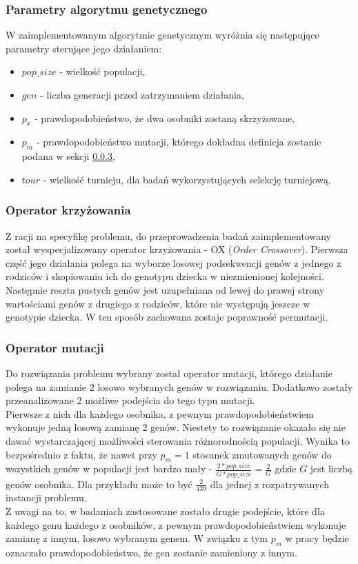 \documentclass{article}
\begin{document}
	\subsubsection{Parametry algorytmu genetycznego}
	W zaimplementowanym algorytmie genetycznym wyróżnia się następujące parametry sterujące jego działaniem:
	\begin{itemize}
		\item $pop\_size$ - wielkość populacji,
		\item $gen$ - liczba generacji przed zatrzymaniem działania,
		\item $p_x$ - prawdopodobieństwo, że dwa osobniki zostaną skrzyżowane,
		\item $p_m$ - prawdopodobieństwo mutacji, którego dokładna definicja zostanie podana w sekcji \ref{op:mutation},
		\item $tour$ - wielkość turnieju, dla badań wykorzystujących selekcję turniejową.
	\end{itemize}
	
	\subsubsection{Operator krzyżowania}
	Z racji na specyfikę problemu, do przeprowadzenia badań zaimplementowany został wyspecjalizowany operator krzyżowania - OX (\textit{Order Crossover}). Pierwsza część jego działania polega na wyborze losowej podsekwencji genów z jednego z rodziców i skopiowaniu ich do genotypu dziecka w niezmienionej kolejności. Następnie reszta pustych genów jest uzupełniana od lewej do prawej strony wartościami genów z drugiego z rodziców, które nie występują jeszcze w genotypie dziecka. W ten sposób zachowana zostaje poprawność permutacji.
	
	\subsubsection{Operator mutacji}\label{op:mutation}
	Do rozwiązania problemu wybrany został operator mutacji, którego działanie polega na zamianie 2 losowo wybranych genów w rozwiązaniu. Dodatkowo zostały przeanalizowane 2 możliwe podejścia do tego typu mutacji.
	\\Pierwsze z nich dla każdego osobnika, z pewnym prawdopodobieństwiem wykonuje jedną losową zamianę 2 genów. Niestety to rozwiązanie okazało się nie dawać wystarczającej możliwości sterowania różnorodnością populacji. Wynika to bezpośrednio z faktu, że nawet przy $p_m = 1$ stosunek zmutowanych genów do wszystkich genów w populacji jest bardzo mały - $\tfrac{2 * pop\_size}{G * pop\_size} = \tfrac{2}{G}$ gdzie $G$ jest liczbą genów osobnika.
	Dla przykładu może to być $\tfrac{2}{439}$ dla jednej z rozpatrywanych instancji problemu.
	\\Z uwagi na to, w badaniach zastosowane zostało drugie podejście, które dla każdego genu każdego z osobników, z pewnym prawdopodobieństwiem wykonuje zamianę z innym, losowo wybranym genem. W związku z tym $p_m$ w pracy będzie oznaczało prawdopodobieństwo, że gen zostanie zamieniony z innym.
	
\end{document}
